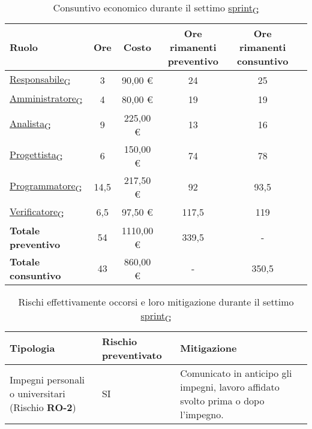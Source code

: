 \begin{table}[!h]
    \centering
    \begin{tabular}{ | l | c | c | c | c | c | }
        \hline
        \textbf{Ruolo} & \textbf{Ore} & \textbf{Costo} & \textbf{Ore rimanenti preventivo} & \textbf{Ore rimanenti consuntivo} \\
        \hline
        \href{https://7last.github.io/docs/rtb/documentazione-interna/glossario\#responsabile}{Responsabile\textsubscript{G}}           &  3    &     90,00 € &  24   &  25   \\
        \href{https://7last.github.io/docs/rtb/documentazione-interna/glossario\#amministratore}{Amministratore\textsubscript{G}}       &  4    &     80,00 € &  19   &  19   \\
        \href{https://7last.github.io/docs/rtb/documentazione-interna/glossario\#analista}{Analista\textsubscript{G}}                   &  9    &    225,00 € &  13   &  16   \\
        \href{https://7last.github.io/docs/rtb/documentazione-interna/glossario\#progettista}{Progettista\textsubscript{G}}             &  6    &    150,00 € &  74   &  78   \\
        \href{https://7last.github.io/docs/rtb/documentazione-interna/glossario\#programmatore}{Programmatore\textsubscript{G}}         & 14,5  &    217,50 € &  92   &  93,5 \\
        \href{https://7last.github.io/docs/rtb/documentazione-interna/glossario\#verificatore}{Verificatore\textsubscript{G}}           &  6,5  &     97,50 € & 117,5 & 119   \\
        \hline
        \textbf{Totale preventivo} &  54   &    1110,00 € &   339,5   &   -   \\
        \hline
        \textbf{Totale consuntivo} &  43   &     860,00 € &   -   &   350,5   \\
        \hline
    \end{tabular}
    \caption{Consuntivo economico durante il settimo \href{https://7last.github.io/docs/rtb/documentazione-interna/glossario\#sprint}{sprint\textsubscript{G}}}

\end{table}

\begin{table}[!h]
    \centering
    \begin{tabular}{ | p{6cm} | p{2.5cm} | p{7.5cm} | }
        \hline
        \textbf{Tipologia} & \textbf{Rischio preventivato} & \textbf{Mitigazione}  \\
        \hline
        Impegni personali o universitari (Rischio \textbf{RO-2})& SI & Comunicato in anticipo gli impegni, lavoro affidato svolto prima o dopo l’impegno. \\
        \hline
    \end{tabular}
    \caption{Rischi effettivamente occorsi e loro mitigazione durante il settimo \href{https://7last.github.io/docs/rtb/documentazione-interna/glossario\#sprint}{sprint\textsubscript{G}}}
\end{table}

